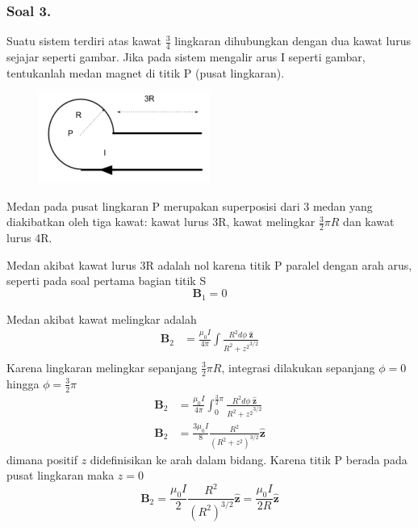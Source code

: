 \documentclass[../../../main.tex]{subfiles}
\begin{document}
\subsubsection*{Soal 3.} Suatu sistem terdiri atas kawat $\frac{3}{4}$ lingkaran dihubungkan dengan dua kawat lurus sejajar seperti gambar. Jika pada sistem mengalir arus I seperti gambar, tentukanlah medan magnet di titik P (pusat lingkaran).
\begin{figure}[ht]
    \centering
    \includegraphics[width=0.5\textwidth]{../Rss/Electromagnetism/Magnetostatics/T3-3.PNG}
\end{figure}

Medan pada pusat lingkaran P merupakan superposisi dari 3 medan yang diakibatkan oleh tiga kawat: kawat lurus 3R, kawat melingkar $\frac{3}{2}\pi R$ dan kawat lurus 4R.

Medan akibat kawat lurus 3R adalah nol karena titik P paralel dengan arah arus, seperti pada soal pertama bagian titik S
\begin{equation*}
    \mathbf{B}_1=0
\end{equation*}

Medan akibat kawat melingkar adalah
\begin{align*}
    \mathbf{B}_2&=\frac{\mu_0 I}{4\pi}\int \frac{R^2  d \phi \;\mathbf{\hat{z}}}{{R^2+z^2}^{3/2}}\\
\end{align*}
Karena lingkaran melingkar sepanjang $\frac{3}{2}\pi R$, integrasi dilakukan sepanjang $\phi=0$ hingga $\phi=\frac{3}{2}\pi $
\begin{align*}
    \mathbf{B}_2&=\frac{\mu_0 I}{4\pi}\int_{0}^{\frac{3}{2}\pi} \frac{R^2  d \phi \;\mathbf{\hat{z}}}{{R^2+z^2}^{3/2}}\\
    \mathbf{B}_2&=\frac{3\mu_0 I}{8}\frac{R^2}{(R^2+z^2)^{3/2}}\mathbf{\hat{z}}
\end{align*}
dimana positif $z$ didefinisikan ke arah dalam bidang. Karena titik P berada pada pusat lingkaran maka $z=0$ 
\begin{equation*}
    \mathbf{B}_2=\frac{\mu_0 I}{2}\frac{R^2}{(R^2)^{3/2}}\mathbf{\hat{z}}=\frac{\mu_0 I}{2R}\mathbf{\hat{z}}
\end{equation*}
\end{document}
